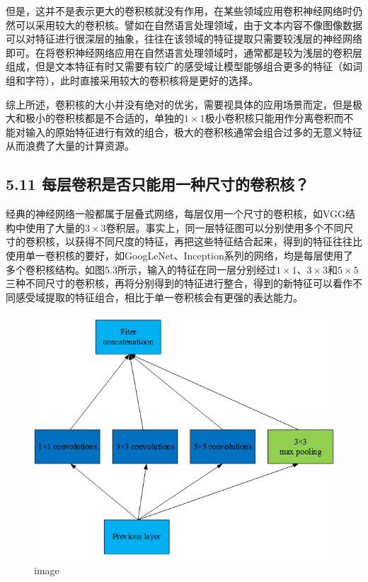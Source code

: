 ​
但是，这并不是表示更大的卷积核就没有作用，在某些领域应用卷积神经网络时仍然可以采用较大的卷积核。譬如在自然语言处理领域，由于文本内容不像图像数据可以对特征进行很深层的抽象，往往在该领域的特征提取只需要较浅层的神经网络即可。在将卷积神经网络应用在自然语言处理领域时，通常都是较为浅层的卷积层组成，但是文本特征有时又需要有较广的感受域让模型能够组合更多的特征（如词组和字符），此时直接采用较大的卷积核将是更好的选择。

​
综上所述，卷积核的大小并没有绝对的优劣，需要视具体的应用场景而定，但是极大和极小的卷积核都是不合适的，单独的\(1\times 1\)极小卷积核只能用作分离卷积而不能对输入的原始特征进行有效的组合，极大的卷积核通常会组合过多的无意义特征从而浪费了大量的计算资源。

\subsection{5.11
每层卷积是否只能用一种尺寸的卷积核？}\label{ux6bcfux5c42ux5377ux79efux662fux5426ux53eaux80fdux7528ux4e00ux79cdux5c3aux5bf8ux7684ux5377ux79efux6838}

​
经典的神经网络一般都属于层叠式网络，每层仅用一个尺寸的卷积核，如VGG结构中使用了大量的\(3×3\)卷积层。事实上，同一层特征图可以分别使用多个不同尺寸的卷积核，以获得不同尺度的特征，再把这些特征结合起来，得到的特征往往比使用单一卷积核的要好，如GoogLeNet、Inception系列的网络，均是每层使用了多个卷积核结构。如图5.3所示，输入的特征在同一层分别经过\(1×1\)、\(3×3\)和\(5×5\)三种不同尺寸的卷积核，再将分别得到的特征进行整合，得到的新特征可以看作不同感受域提取的特征组合，相比于单一卷积核会有更强的表达能力。

\begin{figure}
\centering
\includegraphics{./img/ch5/5.11-1.png}
\caption{image}
\end{figure}

